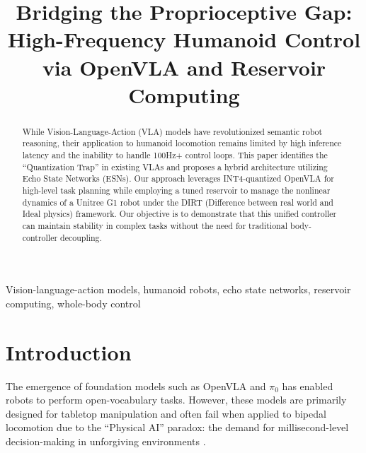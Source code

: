 \documentclass[conference]{IEEEtran}
\begin{document}
\title{Bridging the Proprioceptive Gap: High-Frequency Humanoid Control via OpenVLA and Reservoir Computing}

\author{
\and
{}
}

\maketitle

\begin{abstract}
While Vision-Language-Action (VLA) models have revolutionized semantic robot reasoning, their application to humanoid locomotion remains limited by high inference latency and the inability to handle 100Hz+ control loops. This paper identifies the ``Quantization Trap'' in existing VLAs and proposes a hybrid architecture utilizing Echo State Networks (ESNs). Our approach leverages INT4-quantized OpenVLA for high-level task planning while employing a tuned reservoir to manage the nonlinear dynamics of a Unitree G1 robot under the DIRT (Difference between real world and Ideal physics) framework. Our objective is to demonstrate that this unified controller can maintain stability in complex tasks without the need for traditional body-controller decoupling.
\end{abstract}

\begin{IEEEkeywords}
Vision-language-action models, humanoid robots, echo state networks, reservoir computing, whole-body control
\end{IEEEkeywords}

\section{Introduction}
The emergence of foundation models such as OpenVLA \cite{OpenVLA2025} and $\pi_0$ \cite{Preprints2026} has enabled robots to perform open-vocabulary tasks. However, these models are primarily designed for tabletop manipulation and often fail when applied to bipedal locomotion due to the ``Physical AI'' paradox: the demand for millisecond-level decision-making in unforgiving environments \cite{PhysicalAI2026}.
\end{document}
